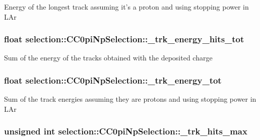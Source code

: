 Energy of the longest track assuming it's a proton and using stopping power in L\-Ar \hypertarget{classselection_1_1CC0piNpSelection_a82a48c6128c34252642d237b98f1b66a}{
\subsubsection[{\-\_\-trk\-\_\-energy\-\_\-hits\-\_\-tot}]{\setlength{\rightskip}{0pt plus 5cm}float selection\-::\-C\-C0pi\-Np\-Selection\-::\-\_\-trk\-\_\-energy\-\_\-hits\-\_\-tot\hspace{0.3cm}{\ttfamily [private]}}}\label{classselection_1_1CC0piNpSelection_a82a48c6128c34252642d237b98f1b66a}
Sum of the energy of the tracks obtained with the deposited charge \hypertarget{classselection_1_1CC0piNpSelection_a8a0da0081e2f182880249debba6551e3}{
\subsubsection[{\-\_\-trk\-\_\-energy\-\_\-tot}]{\setlength{\rightskip}{0pt plus 5cm}float selection\-::\-C\-C0pi\-Np\-Selection\-::\-\_\-trk\-\_\-energy\-\_\-tot\hspace{0.3cm}{\ttfamily [private]}}}\label{classselection_1_1CC0piNpSelection_a8a0da0081e2f182880249debba6551e3}
Sum of the track energies assuming they are protons and using stopping power in L\-Ar \hypertarget{classselection_1_1CC0piNpSelection_a247d186cb641d28f8ea5b02c4f2a39bc}{
\subsubsection[{\-\_\-trk\-\_\-hits\-\_\-max}]{\setlength{\rightskip}{0pt plus 5cm}unsigned int selection\-::\-C\-C0pi\-Np\-Selection\-::\-\_\-trk\-\_\-hits\-\_\-max\hspace{0.3cm}{\ttfamily [private]}}}\label{classselection_1_1CC0piNpSelection_a247d186cb641d28f8ea5b02c4f2a39bc}
